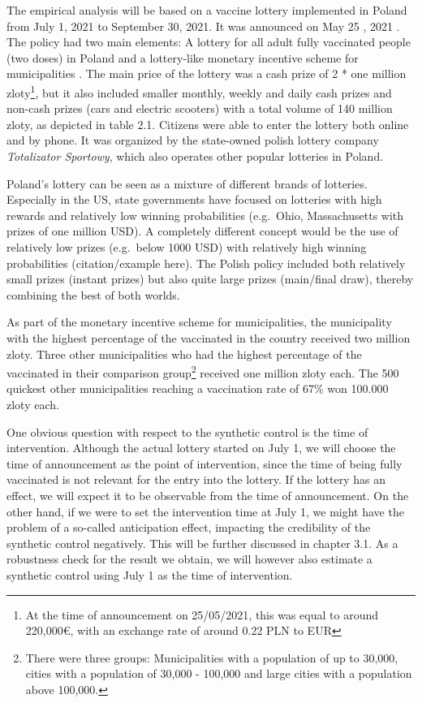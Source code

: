 \documentclass{scrbook}
\begin{document}
\renewcommand*{\arraystretch}{1}

The empirical analysis will be based on a vaccine lottery implemented in
Poland from July 1, 2021 to September 30, 2021. It was announced on May
25 , 2021 \parencite{charlish_poland_2021}. The policy had two main
elements: A lottery for all adult fully vaccinated people (two doses) in
Poland \parencite{service_of_the_republic_of_poland_national_2021} and a
lottery-like monetary incentive scheme for municipalities
\parencite{service_of_the_republic_of_poland_competitions_2021}. The
main price of the lottery was a cash prize of 2 * one million
zloty\footnote{At the time of announcement on 25/05/2021, this was equal to around 220,000€, with an exchange rate of around 0.22 PLN to EUR},
but it also included smaller monthly, weekly and daily cash prizes and
non-cash prizes (cars and electric scooters) with a total volume of 140
million zloty, as depicted in table 2.1. Citizens were able to enter the
lottery both online and by phone. It was organized by the state-owned
polish lottery company \textit{Totalizator Sportowy}, which also
operates other popular lotteries in Poland.

Poland's lottery can be seen as a mixture of different brands of
lotteries. Especially in the US, state governments have focused on
lotteries with high rewards and relatively low winning probabilities
(e.g.~Ohio, Massachusetts with prizes of one million USD). A completely
different concept would be the use of relatively low prizes (e.g.~below
1000 USD) with relatively high winning probabilities (citation/example
here). The Polish policy included both relatively small prizes (instant
prizes) but also quite large prizes (main/final draw), thereby combining
the best of both worlds.

As part of the monetary incentive scheme for municipalities, the
municipality with the highest percentage of the vaccinated in the
country received two million zloty. Three other municipalities who had
the highest percentage of the vaccinated in their comparison
group\footnote{There were three groups: Municipalities with a population of up to 30,000, cities with a population of 30,000 - 100,000 and large cities with a population above 100,000.}
received one million zloty each. The 500 quickest other municipalities
reaching a vaccination rate of 67\% won 100.000 zloty each.

One obvious question with respect to the synthetic control is the time
of intervention. Although the actual lottery started on July 1, we will
choose the time of announcement as the point of intervention, since the
time of being fully vaccinated is not relevant for the entry into the
lottery. If the lottery has an effect, we will expect it to be
observable from the time of announcement. On the other hand, if we were
to set the intervention time at July 1, we might have the problem of a
so-called anticipation effect, impacting the credibility of the
synthetic control negatively. This will be further discussed in chapter
3.1. As a robustness check for the result we obtain, we will however
also estimate a synthetic control using July 1 as the time of
intervention.
\end{document}
